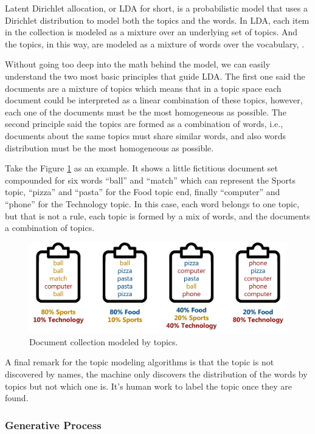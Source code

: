 	Latent Dirichlet allocation, or LDA for short, is a probabilistic model that uses a Dirichlet distribution to model both the topics and the words. In LDA, each item in the collection is modeled as a mixture over an underlying set of topics. And the topics, in this way, are modeled as a mixture of words over the vocabulary, \cite{blei2003latent}.

	Without going too deep into the math behind the model, we can easily understand the two most basic principles that guide LDA. The first one said the documents are a mixture of topics which means that in a topic space each document could be interpreted as a linear combination of these topics, however, each one of the documents must be the most homogeneous as possible. The second principle said the topics are formed as a combination of words, i.e., documents about the same topics must share similar words, and also words distribution must be the most homogeneous as possible.

	Take the Figure \ref{fig:topicmodeling} as an example. It shows a little fictitious document set compounded for six words ``ball'' and ``match'' which can represent the Sports topic, ``pizza'' and ``pasta'' for the Food topic end, finally ``computer'' and ``phone'' for the Technology  topic. In this case, each word belongs to one topic, but that is not a rule, each topic is formed by a mix of words, and the documents a combination of topics.

	\begin{figure}[h!]
		\centering
		\includegraphics[width=\linewidth]{01.Chapters/02.Background/topic_modeling}
		\caption{Document collection modeled by topics.}
		\label{fig:topicmodeling}
	\end{figure}

	A final remark for the topic modeling algorithms is that the topic is not discovered by names, the machine only discovers the distribution of the words by topics but not which one is. It's human work to label the topic once they are found.

	\subsubsection{Generative Process}

